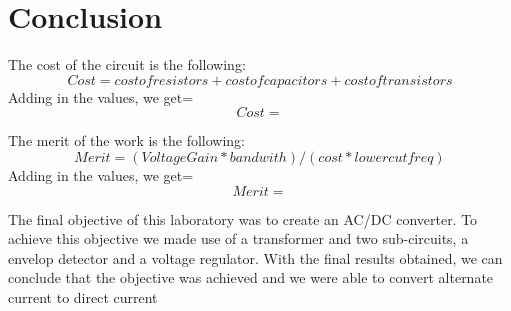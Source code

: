 \section{Conclusion}
\label{sec:conclusion}

The cost of the circuit is the following:
\begin{equation}
Cost = cost of resistors + cost of capacitors + cost of transistors
\end{equation}
Adding in the values, we get=
\begin{equation}
Cost = 
\end{equation}


The merit of the work is the following:
\begin{equation}
Merit = (Voltage Gain * bandwith) / (cost * lower cut freq)
\end{equation}
Adding in the values, we get=
\begin{equation}
Merit = 
\end{equation}

The final objective of this laboratory was to create an AC/DC converter.
To achieve this objective we made use of a transformer and two sub-circuits, a envelop detector and a voltage regulator.
With the final results obtained, we can conclude that the objective was achieved and we were able to convert alternate current to direct current
